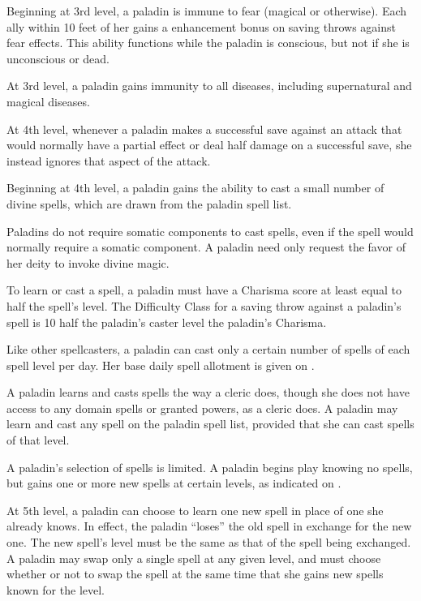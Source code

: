   Beginning at 3rd level, a paladin is immune to fear (magical or otherwise). Each ally within 10 feet of her gains a  enhancement bonus on saving throws against fear effects. This ability functions while the paladin is conscious, but not if she is unconscious or dead.

 At 3rd level, a paladin gains immunity to all diseases, including supernatural and magical diseases.

 At 4th level, whenever a paladin makes a successful save against an attack that would normally have a partial effect or deal half damage on a successful save, she instead ignores that aspect of the attack.

 Beginning at 4th level, a paladin gains the ability to cast a small number of divine spells, which are drawn from the paladin spell list.

Paladins do not require somatic components to cast spells, even if the spell would normally require a somatic component. A paladin need only request the favor of her deity to invoke divine magic.

\par To learn or cast a spell, a paladin must have a Charisma score at least equal to half the spell's level. The Difficulty Class for a saving throw against a paladin's spell is 10 \add half the paladin's caster level \add the paladin's Charisma.

\par Like other spellcasters, a paladin can cast only a certain number of spells of each spell level per day. Her base daily spell allotment is given on .

A paladin learns and casts spells the way a cleric does, though she does not have access to any domain spells or granted powers, as a cleric does. A paladin may learn and cast any spell on the paladin spell list, provided that she can cast spells of that level.

A paladin's selection of spells is limited. A paladin begins play knowing no spells, but gains one or more new spells at certain levels, as indicated on .

\par At 5th level, a paladin can choose to learn one new spell in place of one she already knows. In effect, the paladin ``loses'' the old spell in exchange for the new one. The new spell's level must be the same as that of the spell being exchanged. A paladin may swap only a single spell at any given level, and must choose whether or not to swap the spell at the same time that she gains new spells known for the level.

